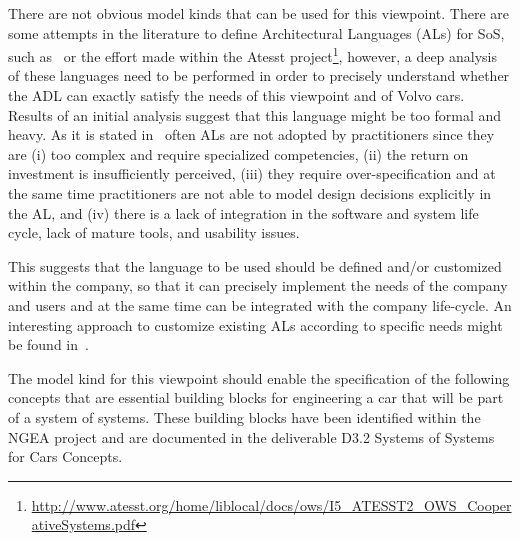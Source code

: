 There are not obvious model kinds that can be used for this viewpoint. %
There are some attempts in the literature to define Architectural Languages (ALs) for SoS, such as~\cite{SoSADL} or the effort made within the Atesst project\footnote{\url{http://www.atesst.org/home/liblocal/docs/ows/I5_ATESST2_OWS_CooperativeSystems.pdf}}, however, a deep analysis of these languages need to be performed in order to precisely understand whether the ADL can exactly satisfy the needs of this viewpoint and of Volvo cars. Results of an initial analysis suggest that this language might be too formal and heavy. As it is stated in~\cite{whatindustrywants,IEEESoftwarePatrizio} often ALs are not adopted by practitioners since they are (i) too complex and require specialized competencies, (ii) the return on investment is insufficiently perceived, (iii) they require over-specification and at the same time practitioners are not able to model design decisions explicitly in the AL, and (iv) there is a lack of integration in the software and system life cycle, lack of
mature tools, and usability issues. 

This suggests that the language to be used should be defined and/or customized within the company, so that it can precisely implement the needs of the company and users and at the same time can be integrated with the company life-cycle.
An interesting approach to customize existing ALs according to specific needs might be found in~\cite{ICSE2010}.

The model kind for this viewpoint should enable the specification of the following concepts that are essential building blocks for engineering a car that will be part of a system of systems. These building blocks have been identified within the NGEA project and are documented in the deliverable D3.2 Systems of Systems for Cars Concepts. 

